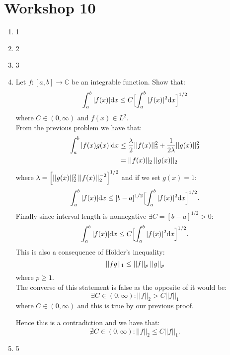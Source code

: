 \pagestyle{fancy}
\fancyhead{}

\section{Workshop 10}
\begin{enumerate}
    \item 1
    \item 2
    \item 3
    
    \newpage

    \item Let $f:[a,b]\rightarrow\mathbb{C}$ be an integrable function. Show that:
    $$\int_{a}^{b}|f(x)|\dd x\leq C\Bigl[\int_{a}^{b}|f(x)|^2\dd x\Bigr]^{1/2}$$
    where $C\in(0,\infty)$ and $f(x)\in L^2$. \\

    From the previous problem we have that:
    \begin{align*}
        \int_{a}^{b}|f(x)g(x)|\dd x
        &\leq\frac{\lambda}{2}||f(x)||_2^2
        +\frac{1}{2\lambda}||g(x)||_2^2 \\
        &=||f(x)||_2\hspace{0.03in}||g(x)||_2
    \end{align*}
    where $\lambda=\Bigl[||g(x)||_2^2\hspace{0.03in}||f(x)||_2^{-2}\Bigr]^{1/2}$
    and if we set $g(x)=1$:
    $$\int_{a}^{b}|f(x)|\dd x
    \leq[b-a]^{1/2}
    \Bigl[\int_{a}^{b}|f(x)|^2\dd x\Bigr]^{1/2}.$$
    Finally since interval length is nonnegative $\exists C=[b-a]^{1/2}>0$:
    $$\int_{a}^{b}|f(x)|\dd x\leq C
    \Bigl[\int_{a}^{b}|f(x)|^2\dd x\Bigr]^{1/2}.$$
    This is also a consequence of H{\"o}lder's inequality:
    $$||fg||_1\leq||f||_p\hspace{0.03in}||g||_p$$
    where $p\geq1$. \\

    The converse of this statement is false as the opposite of it would be:
    $$\exists C\in(0,\infty):||f||_2>C||f||_1$$
    where $C\in(0,\infty)$ and this is true by our previous proof. 
    
    Hence this is a contradiction and we have that:
    $$\nexists C\in(0,\infty):||f||_2\leq C||f||_1.$$

    \newpage

    \item 5
    
    \newpage


\end{enumerate}
